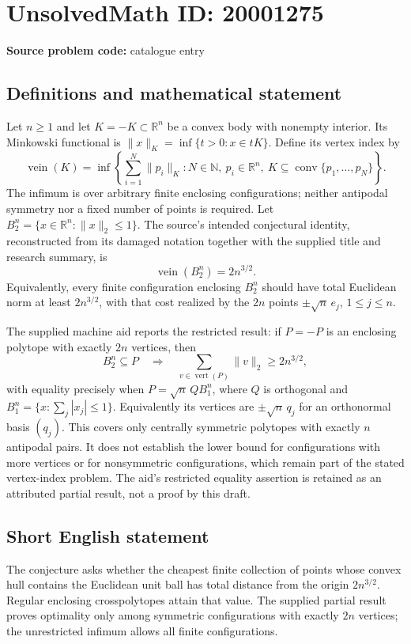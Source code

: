 \documentclass[11pt]{article}
\newcommand{\N}{\mathbb{N}}
\newcommand{\R}{\mathbb{R}}
\begin{document}
\section*{UnsolvedMath ID: 20001275}
\textbf{Source problem code:} catalogue entry
\subsection{Definitions and mathematical statement}
Let $n\geq1$ and let $K=-K\subset\R^n$ be a convex body with nonempty interior. Its Minkowski functional is $\|x\|_K=\inf\{t>0:x\in tK\}$. Define its vertex index by
\[
 \operatorname{vein}(K)=\inf\left\{\sum_{i=1}^{N}\|p_i\|_K:
 N\in\N,\ p_i\in\R^n,\ K\subseteq\operatorname{conv}\{p_1,\ldots,p_N\}\right\}.
\]
The infimum is over arbitrary finite enclosing configurations; neither antipodal symmetry nor a fixed number of points is required. Let $B_2^n=\{x\in\R^n:\|x\|_2\leq1\}$. The source's intended conjectural identity, reconstructed from its damaged notation together with the supplied title and research summary, is
\[
 \operatorname{vein}(B_2^n)=2n^{3/2}.
\]
Equivalently, every finite configuration enclosing $B_2^n$ should have total Euclidean norm at least $2n^{3/2}$, with that cost realized by the $2n$ points $\pm\sqrt n\,e_j$, $1\leq j\leq n$.

The supplied machine aid reports the restricted result: if $P=-P$ is an enclosing polytope with exactly $2n$ vertices, then
\[
 B_2^n\subseteq P\quad\Longrightarrow\quad
 \sum_{v\in\operatorname{vert}(P)}\|v\|_2\geq2n^{3/2},
\]
with equality precisely when $P=\sqrt n\,Q B_1^n$, where $Q$ is orthogonal and $B_1^n=\{x:\sum_j|x_j|\leq1\}$. Equivalently its vertices are $\pm\sqrt n\,q_j$ for an orthonormal basis $(q_j)$. This covers only centrally symmetric polytopes with exactly $n$ antipodal pairs. It does not establish the lower bound for configurations with more vertices or for nonsymmetric configurations, which remain part of the stated vertex-index problem. The aid's restricted equality assertion is retained as an attributed partial result, not a proof by this draft.
\subsection{Short English statement}
The conjecture asks whether the cheapest finite collection of points whose convex hull contains the Euclidean unit ball has total distance from the origin $2n^{3/2}$. Regular enclosing crosspolytopes attain that value. The supplied partial result proves optimality only among symmetric configurations with exactly $2n$ vertices; the unrestricted infimum allows all finite configurations.
\end{document}
